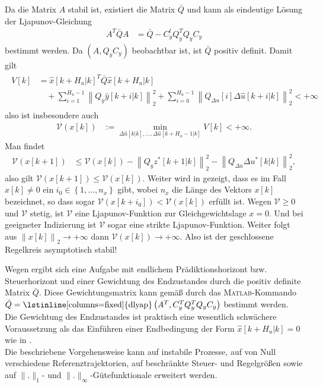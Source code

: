 Da die Matrix $A$ stabil ist, existiert die Matrix $\bar{Q}$ und kann als eindeutige Lösung der Ljapunov-Gleichung
\begin{align}
	A^T\bar{Q}A & = \bar{Q}-C_y^tQ_y^TQ_yC_y \label{eqn:kap_4_ljapunov_glg}
\end{align}
bestimmt werden. Da $(A,Q_yC_y)$ beobachtbar ist, ist $\bar{Q}$ positiv definit. Damit gilt
\begin{align}
\begin{split}\label{eqn:kap_4_guetefunktional_bedingung}
	V[k] & = \hat{x}[k+H_u|k]^T\bar{Q}\hat{x}[k+H_u|k]\\
	& \quad + \sum\limits_{i=1}^{H_u-1}\left\| Q_y\hat{y}[k+i|k]\right\|_2^2+\sum\limits_{i=0}^{H_u-1}\left\| Q_{\Delta u}[i]\Delta \hat{u}[k+i|k]\right\|_2^2 < +\infty  
\end{split}
\end{align}
also ist insbesondere auch
\begin{align}
	\mathcal{V}(x[k]) & := \min\limits_{\Delta\hat{u}[k|k],\ldots,\Delta\hat{u}[k+H_u-1|k]}V[k] < +\infty.
\end{align}
Man findet 
\begin{align*}
	\mathcal{V}(x[k+1]) & \le \mathcal{V}(x[k])-\left\| Q_y z^{\ast}[k+1|k]\right\|_2^2-\left\| Q_{\Delta u}\Delta u^{\ast}[k|k]\right\|_2^2,
\end{align*}
also gilt $\mathcal{V}(x[k+1])\le \mathcal{V}(x[k])$. Weiter wird in \cite{Maciejowski2002} gezeigt, dass es im Fall $x[k]\neq 0$ ein $i_0\in\left\{ 1,\ldots,n_x \right\}$ gibt, wobei
$n_x$ die Länge des Vektors $x[k]$ bezeichnet, so dass sogar $\mathcal{V}(x[k+i_0])<\mathcal{V}(x[k])$ erfüllt ist. Wegen $\mathcal{V}\ge 0$ und $\mathcal{V}$ stetig, ist $\mathcal{V}$ eine
Ljapunov-Funktion zur Gleichgewichtslage $x=0$. Und bei geeigneter Indizierung ist $\mathcal{V}$ sogar eine strikte Ljapunov-Funktion. Weiter folgt aus $\left\| x[k]
\right\|_2\rightarrow+\infty$ dann $\mathcal{V}(x[k])\rightarrow +\infty$. Also ist der geschlossene Regelkreis asymptotisch stabil!
\begin{remark}
Wegen  ergibt sich eine Aufgabe mit endlichem Prädiktionshorizont bzw. Steuerhorizont und einer Gewichtung des Endzustandes durch die
positiv definite Matrix $\bar{Q}$. Diese Gewichtungsmatrix kann gemäß  durch das \textsc{Matlab}-Kommando
$\bar{Q}=\text{\lstinline[columns=fixed]{dlyap}}\left(A^T,C_y^TQ_y^TQ_yC_y\right)$ bestimmt werden. Die Gewichtung des Endzustandes ist praktisch eine wesentlich schwächere
Voraussetzung als das Einführen einer Endbedingung der Form $\hat{x}[k+H_u|k]=0$ wie in .\\
Die beschriebene Vorgehensweise kann auf instabile Prozesse, auf von Null verschiedene Referenztrajektorien, auf beschränkte Steuer- und Regelgrößen sowie auf $\|.\|_1$- und
$\|.\|_{\infty}$-Gütefunktionale erweitert werden.
\end{remark}
